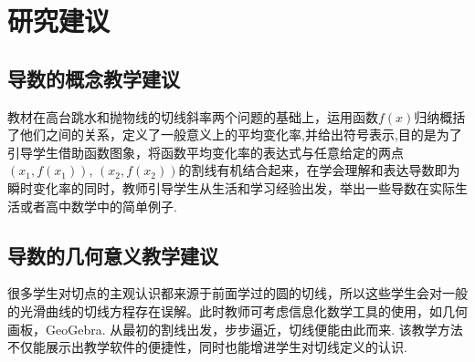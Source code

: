 \section{研究建议}

\subsection{导数的概念教学建议}

教材在高台跳水和抛物线的切线斜率两个问题的基础上，运用函数$f(x)$归纳概括了他们之间的关系，定义了一般意义上的平均变化率,并给出符号表示,目的是为了引导学生借助函数图象，将函数平均变化率的表达式与任意给定的两点$(x_1,f(x_1))$, $(x_2 ,f(x_2))$的割线有机结合起来，在学会理解和表达导数即为瞬时变化率的同时，教师引导学生从生活和学习经验出发，举出一些导数在实际生活或者高中数学中的简单例子.


\subsection{导数的几何意义教学建议}

很多学生对切点的主观认识都来源于前面学过的圆的切线，所以这些学生会对一般的光滑曲线的切线方程存在误解。此时教师可考虑信息化数学工具的使用，如几何画板，GeoGebra. 从最初的割线出发，步步逼近，切线便能由此而来. 该教学方法不仅能展示出教学软件的便捷性，同时也能增进学生对切线定义的认识.